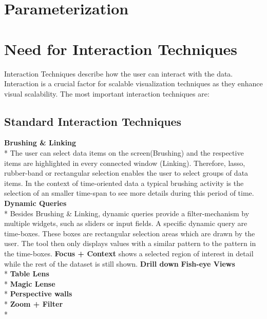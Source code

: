 


\section{Parameterization}

\section{Need for Interaction Techniques}
Interaction Techniques describe how the user can interact with the data. Interaction is a crucial factor for scalable visualization techniques as they enhance visual scalability\cite{tegarden1999}. The most important interaction techniques are: 
\subsection{Standard Interaction Techniques}
\textbf{Brushing \& Linking}\\*
The user can select data items on the screen(Brushing) and the respective items are highlighted in every connected window (Linking). Therefore, lasso, rubber-band or rectangular selection enables the user to select groups of data items\cite{tegarden1999, Aigner2011}. In the context of time-oriented data a typical brushing activity is the selection of an smaller time-span to see more details during this period of time.
\textbf{Dynamic Queries}\\*
Besides Brushing \& Linking, dynamic queries provide a filter-mechanism by multiple widgets, such as sliders or input fields\cite{Hochheiser2004,Shneiderman2008,Aigner2011}. A specific dynamic query are time-boxes. These boxes are rectangular selection areas which are drawn by the user. The tool then only displays values with a similar pattern to the pattern in the time-boxes.
\textbf{Focus + Context} shows a selected region of interest in detail while the rest of the dataset is still shown\cite{Keim2005}. 
\textbf{Drill down}
\textbf{Fish-eye Views}\\*
\textbf{Table Lens}\\*
\textbf{Magic Lense}\\*
\textbf{Perspective walls\cite{Keim2005}}\\*
\textbf{Zoom + Filter}\\*




